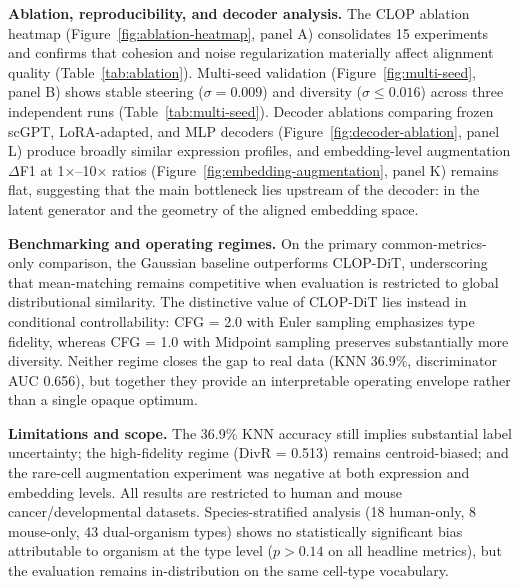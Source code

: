 \documentclass[11pt,a4paper]{article}
\begin{document}
\textbf{Ablation, reproducibility, and decoder analysis.} The CLOP ablation heatmap (Figure~\ref{fig:ablation-heatmap}, panel A) consolidates 15 experiments and confirms that cohesion and noise regularization materially affect alignment quality (Table~\ref{tab:ablation}). Multi-seed validation (Figure~\ref{fig:multi-seed}, panel B) shows stable steering ($\sigma = 0.009$) and diversity ($\sigma \leq 0.016$) across three independent runs (Table~\ref{tab:multi-seed}). Decoder ablations comparing frozen scGPT, LoRA-adapted, and MLP decoders (Figure~\ref{fig:decoder-ablation}, panel L) produce broadly similar expression profiles, and embedding-level augmentation $\Delta$F1 at 1$\times$--10$\times$ ratios (Figure~\ref{fig:embedding-augmentation}, panel K) remains flat, suggesting that the main bottleneck lies upstream of the decoder: in the latent generator and the geometry of the aligned embedding space.

\textbf{Benchmarking and operating regimes.} On the primary common-metrics-only comparison, the Gaussian baseline outperforms CLOP-DiT, underscoring that mean-matching remains competitive when evaluation is restricted to global distributional similarity. The distinctive value of CLOP-DiT lies instead in conditional controllability: CFG = 2.0 with Euler sampling emphasizes type fidelity, whereas CFG = 1.0 with Midpoint sampling preserves substantially more diversity. Neither regime closes the gap to real data (KNN 36.9\%, discriminator AUC 0.656), but together they provide an interpretable operating envelope rather than a single opaque optimum.

\textbf{Limitations and scope.} The 36.9\% KNN accuracy still implies substantial label uncertainty; the high-fidelity regime (DivR = 0.513) remains centroid-biased; and the rare-cell augmentation experiment was negative at both expression and embedding levels. All results are restricted to human and mouse cancer/developmental datasets. Species-stratified analysis (18 human-only, 8 mouse-only, 43 dual-organism types) shows no statistically significant bias attributable to organism at the type level ($p > 0.14$ on all headline metrics), but the evaluation remains in-distribution on the same cell-type vocabulary.
\end{document}
